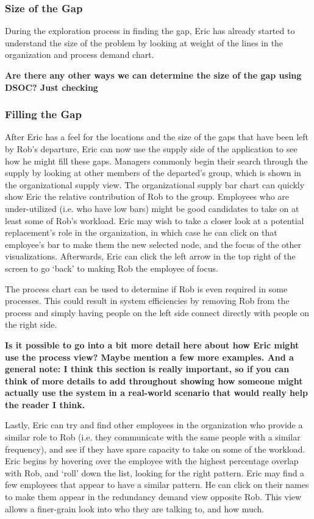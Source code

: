 \documentclass[journal]{vgtc}                %
\begin{document}
\subsubsection{Size of the Gap}
During the exploration process in finding the gap, Eric has already started to understand the size of the problem by looking at weight of the lines in the organization and process demand chart. {\textbf{\color{Plum} Are there any other ways we can determine the size of the gap using DSOC? Just checking}

\subsubsection{Filling the Gap}
After Eric has a feel for the locations and the size of the gaps that have been left by Rob's departure, Eric can now use the supply side of the application to see how he might fill these gaps. Managers commonly begin their search through the supply by looking at other members of the departed's group, which is shown in the organizational supply view. The organizational supply bar chart can quickly show Eric the relative contribution of Rob to the group. Employees who are under-utilized (i.e. who have low bars) might be good candidates to take on at least some of Rob's workload. Eric may wish to take a closer look at a potential replacement's role in the organization, in which case he can click on that employee's bar to make them the new selected node, and the focus of the other visualizations. Afterwards, Eric can click the left arrow in the top right of the screen to go \lq back\rq{} to making Rob the employee of focus.

The process chart can be used to determine if Rob is even required in some processes.  This could result in system efficiencies by removing Rob from the process and simply having people on the left side connect directly with people on the right side.{\textbf{\color{Plum} Is it possible to go into a bit more detail here about how Eric might use the process view? Maybe mention a few more examples. And a general note: I think this section is really important, so if you can think of more details to add throughout showing how someone might actually use the system in a real-world scenario that would really help the reader I think.}

Lastly, Eric can try and find other employees in the organization who provide a similar role to Rob (i.e. they communicate with the same people with a similar frequency), and see if they have spare capacity to take on some of the workload.  Eric begins by hovering over the employee with the highest percentage overlap with Rob, and \lq roll\rq{} down the list, looking for the right pattern. Eric may find a few employees that appear to have a similar pattern. He can click on their names to make them appear in the redundancy demand view opposite Rob. This view allows a finer-grain look into who they are talking to, and how much.

}}
\end{document}
